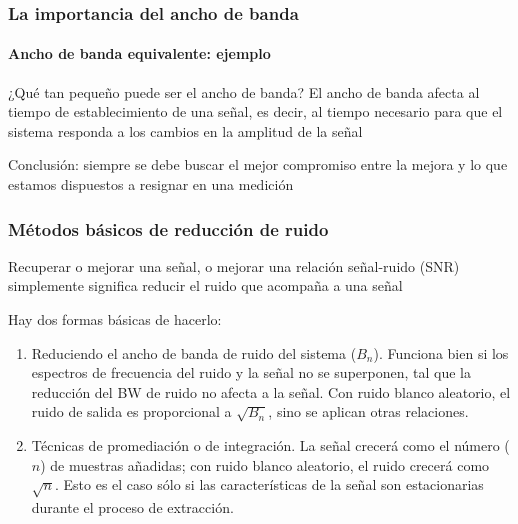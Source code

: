 \documentclass{beamer}
\begin{document}
\begin{frame}
\frametitle{La importancia del ancho de banda}
\framesubtitle{Ancho de banda equivalente: ejemplo}
\begin{alertblock}{¿Qué tan pequeño puede ser el ancho de banda?}
{\color{blue}El ancho de banda afecta al tiempo de establecimiento de una señal, es decir, al tiempo
necesario para que el sistema responda a los cambios en la amplitud de la señal}
\end{alertblock}
\begin{alertblock}{}
Conclusión: siempre se debe buscar el mejor compromiso entre la mejora y lo que
estamos dispuestos a resignar en una medición
\end{alertblock}

\end{frame} 

\begin{frame}
\frametitle{Métodos básicos de reducción de ruido}
\begin{block}{}
Recuperar o mejorar una señal, o mejorar una relación señal-ruido (SNR) 
simplemente significa \alert{reducir el ruido que acompaña a una señal}
\end{block}
\begin{block}{Hay dos formas básicas de hacerlo:}
\begin{enumerate}
\item Reduciendo el ancho de banda de ruido del sistema
($B_n$). Funciona bien si los espectros de frecuencia del ruido y la señal no se
superponen, tal que la reducción del BW de ruido no afecta a la señal. Con ruido
blanco aleatorio, el ruido de salida es proporcional a $\sqrt{B_n}$, sino se
aplican otras relaciones.
\item Técnicas de promediación o de integración. La señal crecerá como el número
($n$) de muestras añadidas; con ruido blanco aleatorio, el ruido crecerá como
$\sqrt{n}$. 
Esto es el caso sólo si las características de la señal son estacionarias
durante el proceso de extracción.
\end{enumerate}
\end{block}
\end{frame} 
\end{document}
